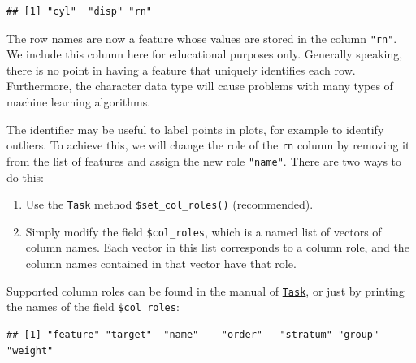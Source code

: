 \documentclass[
]{scrbook}
\newenvironment{Shaded}{\begin{snugshade}}{\end{snugshade}}
\newcommand{\AttributeTok}[1]{\textcolor[rgb]{0.77,0.63,0.00}{#1}}
\newcommand{\CommentTok}[1]{\textcolor[rgb]{0.56,0.35,0.01}{\textit{#1}}}
\newcommand{\FunctionTok}[1]{\textcolor[rgb]{0.00,0.00,0.00}{#1}}
\newcommand{\NormalTok}[1]{#1}
\newcommand{\SpecialCharTok}[1]{\textcolor[rgb]{0.00,0.00,0.00}{#1}}
\newcommand{\StringTok}[1]{\textcolor[rgb]{0.31,0.60,0.02}{#1}}
\providecommand{\tightlist}{%
  \setlength{\itemsep}{0pt}\setlength{\parskip}{0pt}}
\renewenvironment{Shaded} {\begin{snugshade}\small} {\end{snugshade}}
\begin{document}
\begin{verbatim}
## [1] "cyl"  "disp" "rn"
\end{verbatim}

The row names are now a feature whose values are stored in the column \texttt{"rn"}.
We include this column here for educational purposes only.
Generally speaking, there is no point in having a feature that uniquely identifies each row.
Furthermore, the character data type will cause problems with many types of machine learning algorithms.

The identifier may be useful to label points in plots, for example to identify outliers.
To achieve this, we will change the role of the \texttt{rn} column by removing it from the list of features and assign the new role \texttt{"name"}.
There are two ways to do this:

\begin{enumerate}
\def\labelenumi{\arabic{enumi}.}
\tightlist
\item
  Use the \href{https://mlr3.mlr-org.com/reference/Task.html}{\texttt{Task}} method \texttt{\$set\_col\_roles()} (recommended).
\item
  Simply modify the field \texttt{\$col\_roles}, which is a named list of vectors of column names.
  Each vector in this list corresponds to a column role, and the column names contained in that vector have that role.
\end{enumerate}

Supported column roles can be found in the manual of \href{https://mlr3.mlr-org.com/reference/Task.html}{\texttt{Task}}, or just by printing the names of the field \texttt{\$col\_roles}:

\begin{Shaded}
\end{Shaded}

\begin{verbatim}
## [1] "feature" "target"  "name"    "order"   "stratum" "group"   "weight"
\end{verbatim}

\begin{Shaded}
\end{Shaded}
\end{document}
